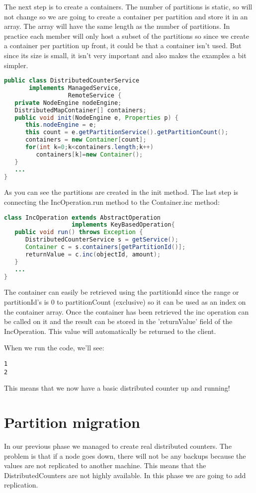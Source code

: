 The next step is to create a containers. The number of partitions is static, so will not change so we are going to create a container per partition and store it in an array. The array will have the same length as the number of partitions. In practice each member will only host a subset of the partitions so since we create a container per partition up front, it could be that a container isn't used. But since its size is small, it isn't very important and also makes the examples a bit simpler.
\begin{lstlisting}[language=java]
public class DistributedCounterService 
       implements ManagedService, 
                  RemoteService {
   private NodeEngine nodeEngine;
   DistributedMapContainer[] containers;
   public void init(NodeEngine e, Properties p) {
      this.nodeEngine = e;
      this count = e.getPartitionService().getPartitionCount();
      containers = new Container[count];
      for(int k=0;k<containers.length;k++) 
         containers[k]=new Container();
   }
   ...
}
\end{lstlisting}
As you can see the partitions are created in the init method. The last step is connecting the IncOperation.run method to the Container.inc method:
\begin{lstlisting}[language=java]
class IncOperation extends AbstractOperation 
                   implements KeyBasedOperation{  
   public void run() throws Exception {
      DistributedCounterService s = getService();
      Container c = s.containers[getPartitionId()];
      returnValue = c.inc(objectId, amount);
   }
   ...  
}
\end{lstlisting}
The container can easily be retrieved using the partitionId since the range or partitionId's is 0 to partitionCount (exclusive) so it can be used as an index on the container array. Once the container has been retrieved the inc operation can be called on it and the result can be stored in the 'returnValue' field of the IncOperation. This value will automatically be returned to the client.

When we run the code, we'll see:
\begin{lstlisting}
1
2
\end{lstlisting}
This means that we now have a basic distributed counter up and running!

\section{Partition migration}
In our previous phase we managed to create real distributed counters. The problem is that if a node goes down, there will not be any backups because the values are not replicated to another machine. This means that the DistributedCounters are not highly available. In this phase we are going to add replication.

